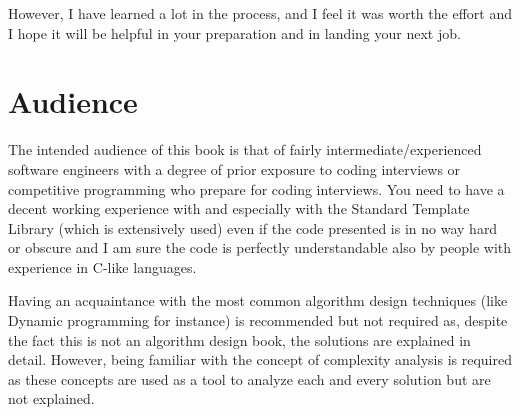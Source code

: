 However, I have learned a lot in the process, and I feel it was worth the effort and I hope it will be helpful in your preparation and in landing your next job. 

\section*{Audience}
The intended audience of this book is that of fairly intermediate/experienced software engineers with a degree of prior exposure to coding interviews or competitive programming who prepare for coding interviews.
You need to have a decent working experience with \CC and especially with the Standard Template Library (which is extensively used) even if the code presented is in no way hard or obscure \CC and I am sure the code is perfectly understandable also by people with experience in C-like languages. 

Having an acquaintance with the most common algorithm design techniques (like Dynamic programming for instance) is recommended but not required as, despite the fact this is not an algorithm design book, the solutions are explained in detail. However, being familiar with the concept of complexity analysis is required as these concepts are used as a tool to analyze each and every solution but are not explained.



